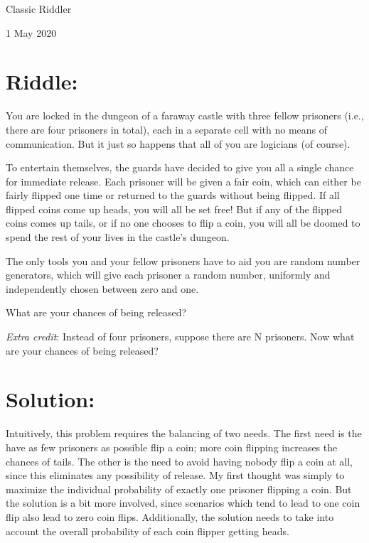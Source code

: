 \documentclass{article}
\begin{document}
\pagestyle{empty} %

\begin{center}
{\LARGE Classic Riddler}

\vspace{0.15in}

{\Large 1 May 2020}
\end{center}


\section*{Riddle:}

You are locked in the dungeon of a faraway castle with three fellow prisoners (i.e., there are four prisoners in total), each in a separate cell with no means of communication.
But it just so happens that all of you are logicians (of course).

To entertain themselves, the guards have decided to give you all a single chance for immediate release.
Each prisoner will be given a fair coin, which can either be fairly flipped one time or returned to the guards without being flipped.
If all flipped coins come up heads, you will all be set free!
But if any of the flipped coins comes up tails, or if no one chooses to flip a coin, you will all be doomed to spend the rest of your lives in the castle's dungeon.

The only tools you and your fellow prisoners have to aid you are random number generators, which will give each prisoner a random number, uniformly and independently chosen between zero and one.

What are your chances of being released?

\textit{Extra credit}: Instead of four prisoners, suppose there are N prisoners. Now what are your chances of being released?

\section*{Solution:}

Intuitively, this problem requires the balancing of two needs.
The first need is the have as few prisoners as possible flip a coin; more coin flipping increases the chances of tails.
The other is the need to avoid having nobody flip a coin at all, since this eliminates any possibility of release.
My first thought was simply to maximize the individual probability of exactly one prisoner flipping a coin.
But the solution is a bit more involved, since scenarios which tend to lead to one coin flip also lead to zero coin flips.
Additionally, the solution needs to take into account the overall probability of each coin flipper getting heads.
\end{document}
